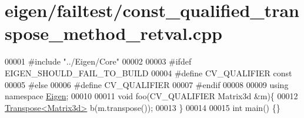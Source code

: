 \hypertarget{eigen_2failtest_2const__qualified__transpose__method__retval_8cpp_source}{}\section{eigen/failtest/const\+\_\+qualified\+\_\+transpose\+\_\+method\+\_\+retval.cpp}
\label{eigen_2failtest_2const__qualified__transpose__method__retval_8cpp_source}

\begin{DoxyCode}
00001 \textcolor{preprocessor}{#include "../Eigen/Core"}
00002 
00003 \textcolor{preprocessor}{#ifdef EIGEN\_SHOULD\_FAIL\_TO\_BUILD}
00004 \textcolor{preprocessor}{#define CV\_QUALIFIER const}
00005 \textcolor{preprocessor}{#else}
00006 \textcolor{preprocessor}{#define CV\_QUALIFIER}
00007 \textcolor{preprocessor}{#endif}
00008 
00009 \textcolor{keyword}{using namespace }\hyperlink{namespace_eigen}{Eigen};
00010 
00011 \textcolor{keywordtype}{void} foo(CV\_QUALIFIER Matrix3d &m)\{
00012     \hyperlink{group___core___module_class_eigen_1_1_transpose}{Transpose<Matrix3d>} b(m.transpose());
00013 \}
00014 
00015 \textcolor{keywordtype}{int} main() \{\}
\end{DoxyCode}
